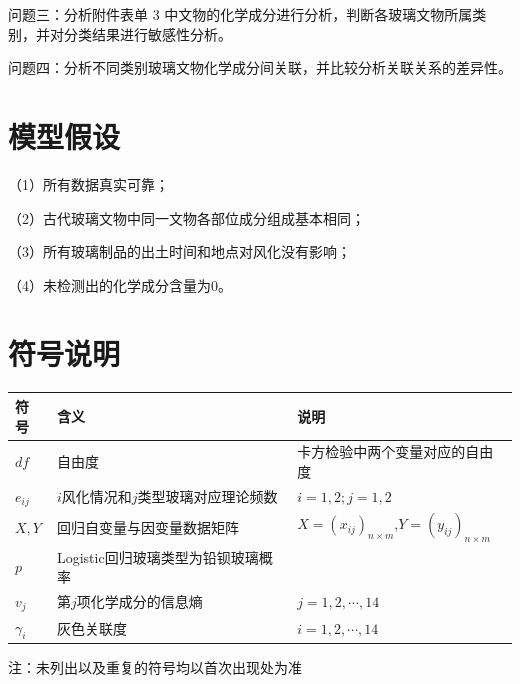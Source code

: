 \documentclass[withoutpreface,bwprint]{cumcmthesis} %
\begin{document}
问题三：分析附件表单 3 中文物的化学成分进行分析，判断各玻璃文物所属类别，并对分类结果进行敏感性分析。

问题四：分析不同类别玻璃文物化学成分间关联，并比较分析关联关系的差异性。



\section{模型假设}
（1）所有数据真实可靠；

（2）古代玻璃文物中同一文物各部位成分组成基本相同；

（3）所有玻璃制品的出土时间和地点对风化没有影响；

（4）未检测出的化学成分含量为0。



\section{符号说明}
\begin{table}[H]%
    \centering
    \begin{threeparttable}   
    \begin{tabular}{p{2.0cm}<{\centering}p{7.0cm}<{\centering}p{7.0cm}<{\centering}}
    \toprule[1.5pt]
    符号 & 含义 & 说明 \\ %
    \hline
    $df$ & 自由度 & 卡方检验中两个变量对应的自由度 \\ %
    $e_{ij}$ & $i$风化情况和$j$类型玻璃对应理论频数 &  $i=1,2;j=1,2$ \\ %
    $X,Y$ & 回归自变量与因变量数据矩阵 &  $X=(x_{ij})_{n\times m}$,$Y=(y_{ij})_{n\times m}$  \\ %
   $p$ & Logistic回归玻璃类型为铅钡玻璃概率 &     \\ %
    $v_j$ & 第$j$项化学成分的信息熵 & $j=1,2,\cdots,14$  \\ %
    $\gamma_i$ & 灰色关联度 &  $i=1,2,\cdots,14$  \\ %
    \bottomrule[1.5pt]
    \end{tabular}
     \begin{tablenotes}
        \footnotesize
        \item 注：未列出以及重复的符号均以首次出现处为准
      \end{tablenotes}
  \end{threeparttable}
\end{table}
\end{document}
